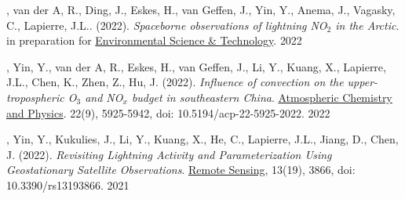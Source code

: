 \vspace{0.5em}

\begin{cvpublications}

\publication
{, van der A, R., Ding, J., Eskes, H., van Geffen, J.,
Yin, Y., Anema, J., Vagasky, C., Lapierre, J.L.. (2022).
\emph{Spaceborne observations of lightning NO$_2$ in the Arctic}.
in preparation for \underline{Environmental Science \& Technology}.} %
{2022} %

\publication
{, Yin, Y., van der A, R., Eskes, H., van Geffen, J.,
Li, Y., Kuang, X., Lapierre, J.L., Chen, K., Zhen, Z., Hu, J. (2022).
\emph{Influence of convection on the upper-tropospheric O$_3$ and NO$_x$ budget in southeastern China}.
\underline{Atmospheric Chemistry and Physics}.
22(9), 5925-5942, doi: 10.5194/acp-22-5925-2022.} %
{2022} %

\publication
{, Yin, Y., Kukulies, J., Li, Y., Kuang, X.,
He, C., Lapierre, J.L., Jiang, D., Chen, J. (2022).
\emph{Revisiting Lightning Activity and Parameterization Using
Geostationary Satellite Observations}.
\underline{Remote Sensing}, 13(19), 3866,
doi: 10.3390/rs13193866.} %
{2021} %
\end{cvpublications}

